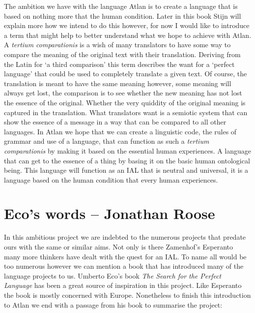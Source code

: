 The ambition we have with the language Atlan is to create a language that is based on nothing more that the human condition. Later in this book Stijn will explain more how we intend to do this however, for now I would like to introduce a term that might help to better understand what we hope to achieve with Atlan. A {\it tertium comparationis} is a wish of many translators to have some way to compare the meaning of the original text with their translation. Deriving from the Latin for ‘a third comparison’ this term describes the want for a ‘perfect language’ that could be used to completely translate a given text. Of course, the translation is meant to have the same meaning however, some meaning will always get lost, the comparison is to see whether the new meaning has not lost the essence of the original. Whether the very quiddity of the original meaning is captured in the translation. What translators want is a semiotic system that can show the essence of a message in a way that can be compared to all other languages. In Atlan we hope that we can create a linguistic code, the rules of grammar and use of a language, that can function as such a {\it tertium comparationis} by making it based on the essential human experiences. A language that can get to the essence of a thing by basing it on the basic human ontological being. This language will function as an IAL that is neutral and universal, it is a language based on the human condition that every human experiences. 


\section{Eco's words -- {\small Jonathan Roose}}


\noindent In this ambitious project we are indebted to the numerous projects that predate ours with the same or similar aims. Not only is there Zamenhof’s Esperanto many more thinkers have dealt with the quest for an IAL. To name all would be too numerous however we can mention a book that has introduced many of the language projects to us. Umberto Eco’s book \textit{The Search for the Perfect Language} has been a great source of inspiration in this project. Like Esperanto the book is mostly concerned with Europe. Nonetheless to finish this introduction to Atlan we end with a passage from his book to summarise the project: 

